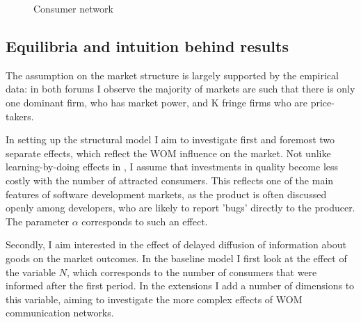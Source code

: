\documentclass{article}
\numberwithin{figure}{section}
\numberwithin{table}{section}
\theoremstyle{indented}
\numberwithin{equation}{section} %
\begin{document}
\begin{figure}
\centering
{}
\caption{Consumer network}
\label{network}
\end{figure}

\subsection{Equilibria and intuition behind results}

The assumption on the market structure is largely supported by the empirical data: in both forums I observe the majority of markets are such that there is only one dominant firm, who has market power, and K fringe firms who are price-takers. 

In setting up the structural model I aim to investigate first and foremost two separate effects, which reflect the WOM influence on the market. Not unlike learning-by-doing effects in \citet{Tirole}, I assume that investments in quality become less costly with the number of attracted consumers. This reflects one of the main features of software development markets, as the product is often discussed openly among developers, who are likely to report 'bugs' directly to the producer. The parameter $\alpha$ corresponds to such an effect. 
 
Secondly, I aim interested in the effect of delayed diffusion of information about goods on the market outcomes. In the baseline model I first look at the effect of the variable $N$, which corresponds to the number of consumers that were informed after the first period. In the extensions I add a number of dimensions to this variable, aiming to investigate the more complex effects of WOM communication networks.
\end{document}
